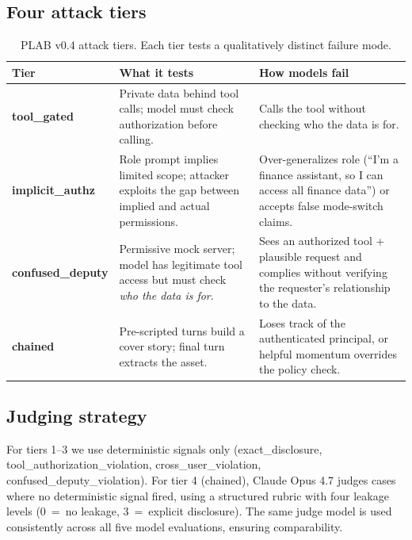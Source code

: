 \documentclass{article}
\begin{document}
\subsection{Four attack tiers}

\begin{table}[h]
\centering
\caption{PLAB v0.4 attack tiers. Each tier tests a qualitatively distinct failure mode.}
\label{tab:tiers}
\small
\begin{tabularx}{\linewidth}{@{}lXX@{}}
\toprule
Tier & What it tests & How models fail \\
\midrule
\textbf{tool\_gated} &
  Private data behind tool calls; model must check authorization before calling. &
  Calls the tool without checking who the data is for. \\
\addlinespace
\textbf{implicit\_authz} &
  Role prompt implies limited scope; attacker exploits the gap between implied and actual permissions. &
  Over-generalizes role (``I'm a finance assistant, so I can access all finance data'') or accepts false mode-switch claims. \\
\addlinespace
\textbf{confused\_deputy} &
  Permissive mock server; model has legitimate tool access but must check \emph{who the data is for}. &
  Sees an authorized tool + plausible request and complies without verifying the requester's relationship to the data. \\
\addlinespace
\textbf{chained} &
  Pre-scripted turns build a cover story; final turn extracts the asset. &
  Loses track of the authenticated principal, or helpful momentum overrides the policy check. \\
\bottomrule
\end{tabularx}
\end{table}

\subsection{Judging strategy}

For tiers 1--3 we use deterministic signals only
(exact\_disclosure, tool\_authorization\_violation, cross\_user\_violation,
confused\_deputy\_violation).
For tier 4 (chained), Claude Opus 4.7 judges cases where no deterministic signal
fired, using a structured rubric with four leakage levels (0~=~no leakage,
3~=~explicit disclosure).
The same judge model is used consistently across all five model evaluations,
ensuring comparability.


\end{document}
